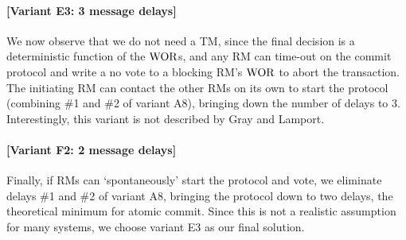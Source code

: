 \paragraph{[Variant E3: 3 message delays]} We now observe that we do not need a TM, 
since the final decision is a deterministic function of the $\mathrm{WOR}$s, 
and any RM can time-out on the commit protocol and write a no vote to a blocking RM's $\mathrm{WOR}$ to abort the transaction. 
The initiating RM can contact the other RMs on its own to start the protocol (combining \#1 and \#2 of variant A8), 
bringing down the number of delays to 3. Interestingly, this variant is not described by Gray and Lamport.

\paragraph{[Variant F2: 2 message delays]} Finally, if RMs can `spontaneously' start the protocol and vote, 
we eliminate delays \#1 and \#2 of variant A8, bringing the protocol down to two delays, 
the theoretical minimum for atomic commit. Since this is not a realistic assumption for many systems, we choose variant E3 as our final solution.



